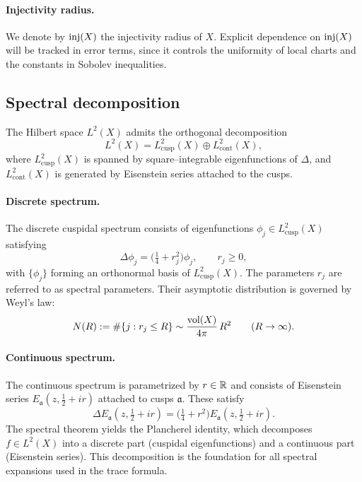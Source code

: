 \paragraph{Injectivity radius.}
We denote by $\mathrm{inj}(X)$ the injectivity radius of $X$. Explicit dependence on
$\mathrm{inj}(X)$ will be tracked in error terms, since it controls the uniformity of local
charts and the constants in Sobolev inequalities.

\subsection{Spectral decomposition}\label{subsec:spectral}

The Hilbert space $L^2(X)$ admits the orthogonal decomposition
\[
  L^2(X) = L^2_{\mathrm{cusp}}(X) \oplus L^2_{\mathrm{cont}}(X),
\]
where $L^2_{\mathrm{cusp}}(X)$ is spanned by square–integrable eigenfunctions of
$\Delta$, and $L^2_{\mathrm{cont}}(X)$ is generated by Eisenstein series attached to the
cusps.

\paragraph{Discrete spectrum.}
The discrete cuspidal spectrum consists of eigenfunctions
$\phi_j \in L^2_{\mathrm{cusp}}(X)$ satisfying
\[
  \Delta \phi_j = \Big(\tfrac{1}{4} + r_j^2\Big)\phi_j, \qquad r_j \geq 0,
\]
with $\{\phi_j\}$ forming an orthonormal basis of $L^2_{\mathrm{cusp}}(X)$. The
parameters $r_j$ are referred to as spectral parameters. Their asymptotic distribution is
governed by Weyl’s law:
\[
  N(R) := \#\{ j : r_j \leq R\}
  \sim \frac{\operatorname{vol}(X)}{4\pi}\,R^2 \qquad (R\to\infty).
\]

\paragraph{Continuous spectrum.}
The continuous spectrum is parametrized by $r \in \mathbb{R}$ and consists of Eisenstein series
$E_\mathfrak{a}(z,\tfrac{1}{2}+ir)$ attached to cusps $\mathfrak{a}$. These satisfy
\[
  \Delta E_\mathfrak{a}(z,\tfrac{1}{2}+ir)
   = \Big(\tfrac{1}{4}+r^2\Big)E_\mathfrak{a}(z,\tfrac{1}{2}+ir).
\]
The spectral theorem yields the Plancherel identity, which decomposes $f\in L^2(X)$ into
a discrete part (cuspidal eigenfunctions) and a continuous part (Eisenstein series).
This decomposition is the foundation for all spectral expansions used in the trace
formula.
